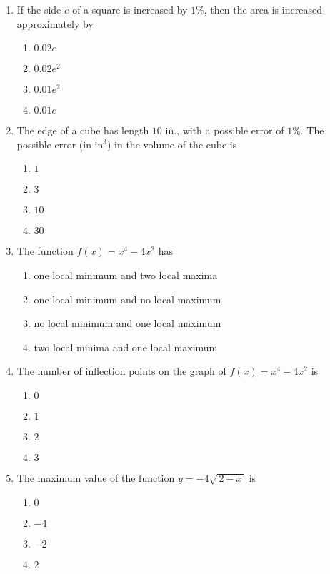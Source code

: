 \documentclass[12pt]{article}
\begin{document}
\begin{enumerate}[label=\textbf{A\arabic*.},resume]

\item If the side $e$ of a square is increased by $1\%$, then the area is increased approximately by
\begin{enumerate}[label=(\Alph*)]
\item $0.02e$ \item $0.02e^{2}$ \item $0.01e^{2}$ \item $0.01e$
\end{enumerate}

\item The edge of a cube has length $10$ in., with a possible error of $1\%$. The possible error (in $\text{in}^{3}$) in the volume of the cube is
\begin{enumerate}[label=(\Alph*)]
\item $1$ \item $3$ \item $10$ \item $30$
\end{enumerate}

\item The function $f(x)=x^{4}-4x^{2}$ has
\begin{enumerate}[label=(\Alph*)]
\item one local minimum and two local maxima
\item one local minimum and no local maximum
\item no local minimum and one local maximum
\item two local minima and one local maximum
\end{enumerate}

\item The number of inflection points on the graph of $f(x)=x^{4}-4x^{2}$ is
\begin{enumerate}[label=(\Alph*)]
\item $0$ \item $1$ \item $2$ \item $3$
\end{enumerate}

\item The maximum value of the function $y=-4\sqrt{\,2-x\,}$ is
\begin{enumerate}[label=(\Alph*)]
\item $0$ \item $-4$ \item $-2$ \item $2$
\end{enumerate}


\end{enumerate}
\end{document}
